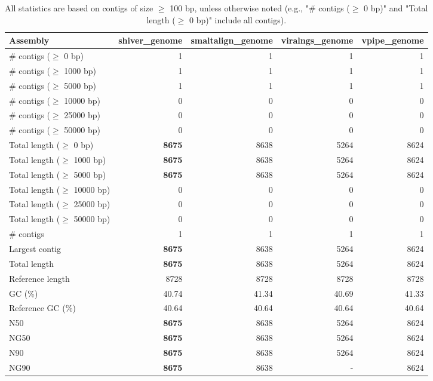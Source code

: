\documentclass[12pt,a4paper]{article}
\begin{document}
\begin{table}[ht]
\begin{center}
\caption{All statistics are based on contigs of size $\geq$ 100 bp, unless otherwise noted (e.g., "\# contigs ($\geq$ 0 bp)" and "Total length ($\geq$ 0 bp)" include all contigs).}
\begin{tabular}{|l*{4}{|r}|}
\hline
Assembly & shiver\_genome & smaltalign\_genome & viralngs\_genome & vpipe\_genome \\ \hline
\# contigs ($\geq$ 0 bp) & 1 & 1 & 1 & 1 \\ \hline
\# contigs ($\geq$ 1000 bp) & 1 & 1 & 1 & 1 \\ \hline
\# contigs ($\geq$ 5000 bp) & 1 & 1 & 1 & 1 \\ \hline
\# contigs ($\geq$ 10000 bp) & 0 & 0 & 0 & 0 \\ \hline
\# contigs ($\geq$ 25000 bp) & 0 & 0 & 0 & 0 \\ \hline
\# contigs ($\geq$ 50000 bp) & 0 & 0 & 0 & 0 \\ \hline
Total length ($\geq$ 0 bp) & {\bf 8675} & 8638 & 5264 & 8624 \\ \hline
Total length ($\geq$ 1000 bp) & {\bf 8675} & 8638 & 5264 & 8624 \\ \hline
Total length ($\geq$ 5000 bp) & {\bf 8675} & 8638 & 5264 & 8624 \\ \hline
Total length ($\geq$ 10000 bp) & 0 & 0 & 0 & 0 \\ \hline
Total length ($\geq$ 25000 bp) & 0 & 0 & 0 & 0 \\ \hline
Total length ($\geq$ 50000 bp) & 0 & 0 & 0 & 0 \\ \hline
\# contigs & 1 & 1 & 1 & 1 \\ \hline
Largest contig & {\bf 8675} & 8638 & 5264 & 8624 \\ \hline
Total length & {\bf 8675} & 8638 & 5264 & 8624 \\ \hline
Reference length & 8728 & 8728 & 8728 & 8728 \\ \hline
GC (\%) & 40.74 & 41.34 & 40.69 & 41.33 \\ \hline
Reference GC (\%) & 40.64 & 40.64 & 40.64 & 40.64 \\ \hline
N50 & {\bf 8675} & 8638 & 5264 & 8624 \\ \hline
NG50 & {\bf 8675} & 8638 & 5264 & 8624 \\ \hline
N90 & {\bf 8675} & 8638 & 5264 & 8624 \\ \hline
NG90 & {\bf 8675} & 8638 & - & 8624 \\ \hline

\end{tabular}
\end{center}
\end{table}
\end{document}
